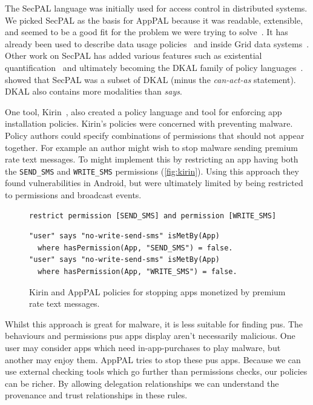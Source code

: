 \documentclass[]{scrartcl}
\begin{document}
The SecPAL language was initially used for access control in distributed systems.
We picked SecPAL as the basis for AppPAL because it was readable, extensible, and seemed to be a good fit for the problem we were trying to solve~\citep{Hallett:2014un}.
It has already been used to describe data usage policies~\citep{Aziz:2011vt} and inside Grid data systems~\cite{Humphrey:2007wc}.
Other work on SecPAL has added various features such as existential quantification~\citep{Becker:2009vt} and ultimately becoming the DKAL family of policy languages~\citep{Gurevich:2008fz,Gurevich:Qo5E3M3}.
\citeauthor{Gurevich:2008fz} showed that SecPAL was a subset of DKAL (minus the \emph{can-act-as} statement).
DKAL also contains more modalities than \emph{says}.

One tool, Kirin~\citep{Enck:2009ko}, also created a policy language and tool for enforcing app installation policies.
Kirin's policies were concerned with preventing malware.
Policy authors could specify combinations of permissions that should not appear together.
For example an author might wish to stop malware sending premium rate text messages.
To might implement this by restricting an app having both the \texttt{SEND\_SMS} and \texttt{WRITE\_SMS} permissions (\autoref{fig:kirin}).
Using this approach they found vulnerabilities in Android, but were ultimately limited by being restricted to permissions and broadcast events.
\begin{figure}
\begin{lstlisting}
restrict permission [SEND_SMS] and permission [WRITE_SMS]
\end{lstlisting}
\begin{lstlisting}
"user" says "no-write-send-sms" isMetBy(App)
  where hasPermission(App, "SEND_SMS") = false.
"user" says "no-write-send-sms" isMetBy(App)
  where hasPermission(App, "WRITE_SMS") = false.
\end{lstlisting}
\caption{Kirin and AppPAL policies for stopping apps monetized by premium rate text messages.}
\label{fig:kirin}
\end{figure}

Whilst this approach is great for malware, it is less suitable for finding \ac{pus}.
The behaviours and permissions \ac{pus} apps display aren't necessarily malicious.
One user may consider apps which need in-app-purchases to play malware, but another may enjoy them.
AppPAL tries to stop these \ac{pus} apps.
Because we can use external checking tools which go further than permissions checks, our policies can be richer.
By allowing delegation relationships we can understand the provenance and trust relationships in these rules.
\end{document}
